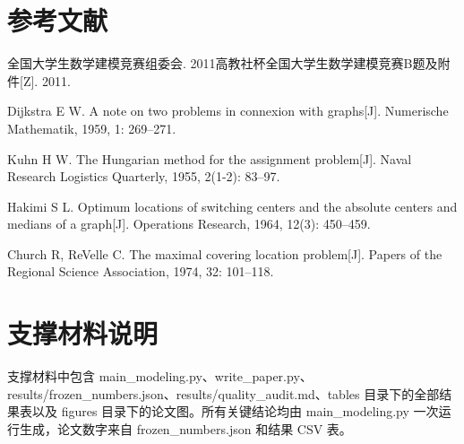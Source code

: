 \documentclass[UTF8,a4paper,12pt]{ctexart}
\begin{document}
\section{参考文献}
\begin{enumerate}[label={[\arabic*]}]
\item 全国大学生数学建模竞赛组委会. 2011高教社杯全国大学生数学建模竞赛B题及附件[Z]. 2011.
\item Dijkstra E W. A note on two problems in connexion with graphs[J]. Numerische Mathematik, 1959, 1: 269--271.
\item Kuhn H W. The Hungarian method for the assignment problem[J]. Naval Research Logistics Quarterly, 1955, 2(1-2): 83--97.
\item Hakimi S L. Optimum locations of switching centers and the absolute centers and medians of a graph[J]. Operations Research, 1964, 12(3): 450--459.
\item Church R, ReVelle C. The maximal covering location problem[J]. Papers of the Regional Science Association, 1974, 32: 101--118.
\end{enumerate}

\appendix
\section{支撑材料说明}
支撑材料中包含 main\_modeling.py、write\_paper.py、results/frozen\_numbers.json、results/quality\_audit.md、tables 目录下的全部结果表以及 figures 目录下的论文图。所有关键结论均由 main\_modeling.py 一次运行生成，论文数字来自 frozen\_numbers.json 和结果 CSV 表。
\end{document}
